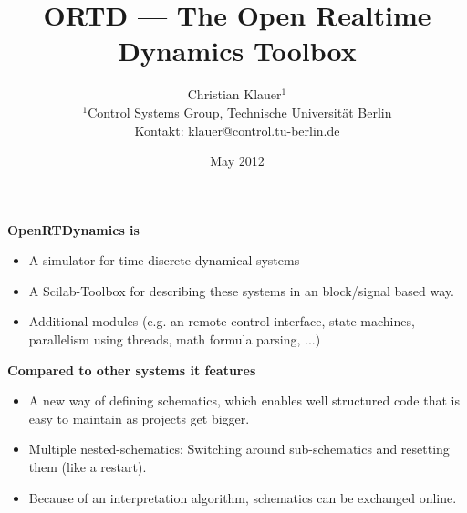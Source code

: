 \documentclass[serif,9pt,xcolor=dvipsnames]{beamer}
\title[]{ORTD --- The Open Realtime Dynamics Toolbox}
\subtitle{} %
\date{May 2012}
\author{Christian Klauer$^{1}$\\
\tiny $^{1}$Control Systems Group, Technische Universität Berlin\\
Kontakt: klauer@control.tu-berlin.de
}
\begin{document}




\begin{frame}
  \maketitle
\end{frame}


\begin{frame}

\textbf{OpenRTDynamics is}

 \begin{itemize}
  \item A simulator for time-discrete dynamical systems
  \item A Scilab-Toolbox for describing these systems in an block/signal based way.
  \item Additional modules (e.g. an remote control interface, state machines, parallelism using threads, math formula parsing, ...)
 \end{itemize}

\textbf{Compared to other systems it features}
\begin{itemize}
 \item A new way of defining schematics, which enables well structured code that is easy to maintain as projects get bigger.
 \item Multiple nested-schematics: Switching around sub-schematics and resetting them (like a restart).
 \item Because of an interpretation algorithm, schematics can be exchanged online.
\end{itemize}


\end{frame}
\end{document}
